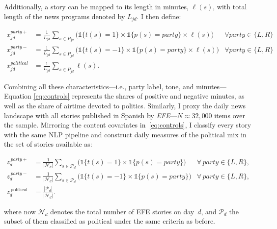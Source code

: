 \documentclass[12pt]{article}
\begin{document}
	
	Additionally, a story can be mapped to its length in minutes, \( \ell(s)\), with total length of the news programs  denoted by $L_{jd}$. I then define: 
	
	
	


		\begin{equation}\label{eq:controls}
		\begin{aligned}
			x_{jd}^{party+}&= \frac{1}{L_{jd}} \sum_{s \in P_{jd}}\bigg(\mathds{1}\{t(s)=1\} \times \mathds{1}\{p(s)=party\}\times \ell(s) \bigg) &\forall party \in \{L,R\} \\
			x_{jd}^{party-}&= \frac{1}{L_{jd}} \sum_{s \in P_{jd}}\bigg( \mathds{1}\{t(s)=-1\} \times \mathds{1}\{p(s)=party\} \times \ell(s)\bigg) &\forall party \in \{L,R\} \\
			x_{jd}^{political}&=\frac{1}{L_{jd}} \sum_{s \in P_{jd}}\ell(s).
		\end{aligned}
	\end{equation} 
	

 Combining all these characteristics—i.e., party label, tone, and minutes— Equation \ref{eq:controls} represents the  shares of positive and negative minutes, as well as the share of airtime devoted to politics.	Similarly, I proxy the daily news landscape with all stories published in Spanish by \emph{ EFE}—$N\approx32{,}000$ items over the sample. Mirroring the content covariates in~\eqref{eq:controls}, I classify every  story with the same NLP pipeline and construct daily measures of the political mix in the set of stories available as:
	
	\begin{equation}\label{eq:efe}
		\begin{aligned}
			z_d^{\,party+} &= \frac{1}{|\mathcal{N}_d|}\sum_{s\in \mathcal{P}_d}
			\bigg(\mathds{1}\{t(s)=1\}\times \mathds{1}\{p(s)=\textit{party}\}\bigg)
			&\forall\,\textit{party}\in\{L,R\},\\
			z_d^{\,party-} &= \frac{1}{|\mathcal{N}_d|}\sum_{s\in \mathcal{P}_d}
			\bigg(\mathds{1}\{t(s)=-1\}\times \mathds{1}\{p(s)=\textit{party}\}\bigg)
			&\forall\,\textit{party}\in\{L,R\},\\
			z_d^{\,\text{political}} &= \frac{|\mathcal{P}_d|}{|\mathcal{N}_d|}.
		\end{aligned}
	\end{equation}
	
	where now \(\mathcal{N}_d\) denotes the total number of  EFE stories on day~\(d\), and \(\mathcal{P}_d\) the subset of them classified as political under the same criteria as before.
	
\end{document}
